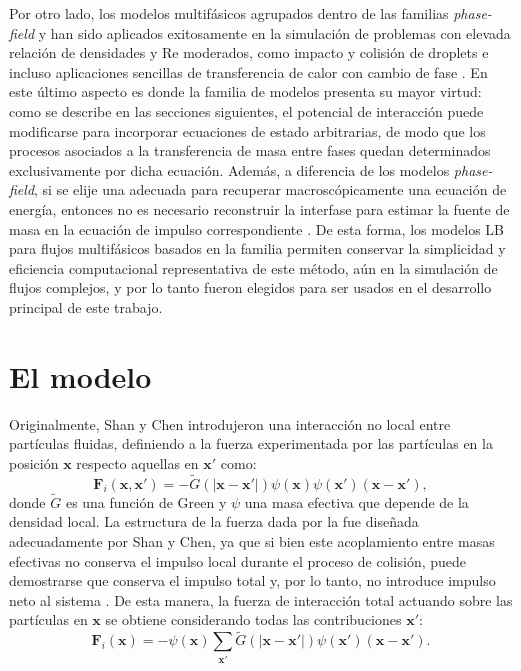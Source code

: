 Por otro lado, los modelos multif\'asicos agrupados dentro de las familias \emph{phase-field} y \pp{} han sido aplicados exitosamente en la simulaci\'on de problemas con elevada relaci\'on de densidades y Re moderados, como impacto y colisi\'on de droplets \cite{li_lattice_2013,lee_stable_2005} e incluso aplicaciones sencillas de transferencia de calor con cambio de fase \cite{safari_consistent_2014,markus_pool_2012,gong_lattice_2015}. En este \'ultimo aspecto es donde la familia de modelos \pp{} presenta su mayor virtud: como se describe en las secciones siguientes, el potencial de interacci\'on puede modificarse para incorporar ecuaciones de estado arbitrarias, de modo que los procesos asociados a la transferencia de masa entre fases quedan determinados exclusivamente por  dicha ecuaci\'on. Adem\'as, a diferencia de los modelos \emph{phase-field}, si se elije una \lbe{} adecuada para recuperar macrosc\'opicamente una ecuaci\'on de energ\'ia, entonces no es necesario reconstruir la interfase para estimar la fuente de masa en la ecuaci\'on de impulso correspondiente \cite{safari_consistent_2014,safari_extended_2013}. De esta forma, los modelos LB para flujos multif\'asicos basados en la familia \pp{} permiten conservar la simplicidad y eficiencia computacional representativa de este m\'etodo, a\'un en la simulaci\'on de flujos complejos, y por lo tanto fueron elegidos para ser usados en el desarrollo principal de este trabajo.


\section{El modelo \pp{}}
Originalmente, Shan y Chen introdujeron una interacci\'on no local entre part\'iculas fluidas, definiendo a la fuerza experimentada por las part\'iculas en la posici\'on $\bm{x}$ respecto aquellas en $\bm{x}'$ como:
\begin{equation}
	\bm{F}_i(\bm{x},\bm{x}') = -\tilde{G}(|\bm{x}-\bm{x}'|)\psi(\bm{x})\psi(\bm{x'})(\bm{x}-\bm{x}'),
	\label{eq:fint_green}
\end{equation}
donde $\tilde{G}$ es una funci\'on de Green y $\psi$ una masa efectiva que depende de la densidad local. La estructura de la fuerza dada por la  fue dise\~nada adecuadamente por Shan y Chen, ya que si bien este acoplamiento entre masas efectivas no conserva el impulso local durante el proceso de colisi\'on, puede demostrarse que conserva el impulso total y, por lo tanto, no introduce impulso neto al sistema \cite{shan_simulation_1994}. De esta manera, la fuerza de interacci\'on total actuando sobre las part\'iculas en $\bm{x}$ se obtiene considerando todas las contribuciones $\bm{x}'$:
\begin{equation}
	\bm{F}_i(\bm{x}) = -\psi(\bm{x}) \sum_{\bm{x}'} \tilde{G}(|\bm{x}-\bm{x}'|)\psi(\bm{x}')(\bm{x}-\bm{x}').
\end{equation}

